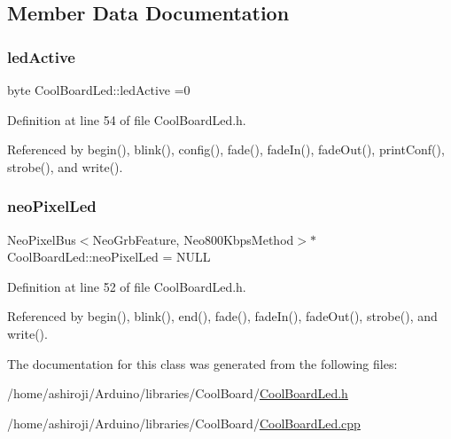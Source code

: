 \subsection{Member Data Documentation}
\mbox{\label{classCoolBoardLed_a5f17c135516fcf4b44ea8a096ba0177a}} 
\subsubsection{\texorpdfstring{led\+Active}{ledActive}}
{\footnotesize\ttfamily byte Cool\+Board\+Led\+::led\+Active =0\hspace{0.3cm}{\ttfamily [private]}}



Definition at line 54 of file Cool\+Board\+Led.\+h.



Referenced by begin(), blink(), config(), fade(), fade\+In(), fade\+Out(), print\+Conf(), strobe(), and write().

\mbox{\label{classCoolBoardLed_ac2c13fa462a010cd9242bf297c013923}} 
\subsubsection{\texorpdfstring{neo\+Pixel\+Led}{neoPixelLed}}
{\footnotesize\ttfamily Neo\+Pixel\+Bus$<$Neo\+Grb\+Feature, Neo800\+Kbps\+Method$>$$\ast$ Cool\+Board\+Led\+::neo\+Pixel\+Led = N\+U\+LL\hspace{0.3cm}{\ttfamily [private]}}



Definition at line 52 of file Cool\+Board\+Led.\+h.



Referenced by begin(), blink(), end(), fade(), fade\+In(), fade\+Out(), strobe(), and write().



The documentation for this class was generated from the following files\+:\begin{DoxyCompactItemize}
\item 
/home/ashiroji/\+Arduino/libraries/\+Cool\+Board/\hyperlink{CoolBoardLed_8h}{Cool\+Board\+Led.\+h}\item 
/home/ashiroji/\+Arduino/libraries/\+Cool\+Board/\hyperlink{CoolBoardLed_8cpp}{Cool\+Board\+Led.\+cpp}\end{DoxyCompactItemize}
